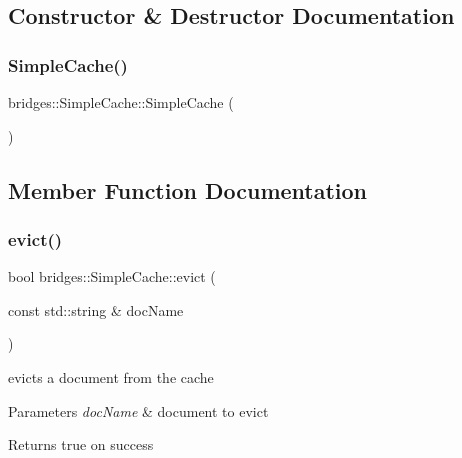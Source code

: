 \subsection{Constructor \& Destructor Documentation}
\mbox{\label{classbridges_1_1_simple_cache_af6454edafca975489988b8df61d1cd2a}} 
\subsubsection{\texorpdfstring{SimpleCache()}{SimpleCache()}}
{\footnotesize\ttfamily bridges\+::\+Simple\+Cache\+::\+Simple\+Cache (\begin{DoxyParamCaption}{ }\end{DoxyParamCaption})\hspace{0.3cm}{\ttfamily [inline]}}



\subsection{Member Function Documentation}
\mbox{\label{classbridges_1_1_simple_cache_a1a676acaaecd1e5368a3d51a654d93bc}} 
\subsubsection{\texorpdfstring{evict()}{evict()}}
{\footnotesize\ttfamily bool bridges\+::\+Simple\+Cache\+::evict (\begin{DoxyParamCaption}\item[{const std\+::string \&}]{doc\+Name }\end{DoxyParamCaption})\hspace{0.3cm}{\ttfamily [inline]}}



evicts a document from the cache 


\begin{DoxyParams}{Parameters}
{\em doc\+Name} & document to evict \\
\hline
\end{DoxyParams}
\begin{DoxyReturn}{Returns}
true on success 
\end{DoxyReturn}
\mbox{\label{classbridges_1_1_simple_cache_a905ad2e7fb1b6784a5f70caf024b157f}} 

